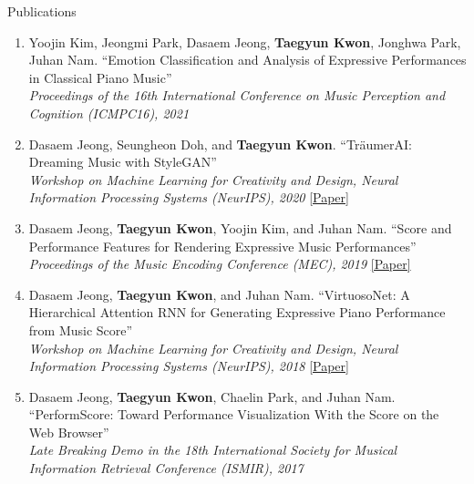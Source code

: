 \begin{rSection}{Publications}
\begin{enumerate}
\begin{minipage}[t]{\linewidth}
\href{https://mac.kaist.ac.kr/pubs/kwon-isbjsb2023.pdf}{[Paper]}
\end{minipage}
\item \begin{minipage}[t]{\linewidth}Yoojin Kim, Jeongmi Park, Dasaem Jeong, \textbf{Taegyun Kwon}, Jonghwa Park, Juhan Nam.
``Emotion Classification and Analysis of Expressive Performances in Classical Piano Music''\\\textit{Proceedings of the 16th International Conference on Music Perception and Cognition (ICMPC16), 2021}
\end{minipage}
\item \begin{minipage}[t]{\linewidth}Dasaem Jeong, Seungheon Doh, and \textbf{Taegyun Kwon}.
``TräumerAI: Dreaming Music with StyleGAN''\\\textit{Workshop on Machine Learning for Creativity and Design, Neural Information Processing Systems (NeurIPS), 2020}
\href{https://arxiv.org/abs/2102.04680}{[Paper]}
\end{minipage}
\item \begin{minipage}[t]{\linewidth}Dasaem Jeong, \textbf{Taegyun Kwon}, Yoojin Kim, and Juhan Nam.
``Score and Performance Features for Rendering Expressive Music Performances''\\\textit{Proceedings of the Music Encoding Conference (MEC), 2019}
\href{https://music-encoding.org/conference/abstracts/abstracts_mec2019/Dasaem%20Jeong%20Music%20Encoding%20Conference%202019.pdf}{[Paper]}
\end{minipage}
\item \begin{minipage}[t]{\linewidth}Dasaem Jeong, \textbf{Taegyun Kwon}, and Juhan Nam.
``VirtuosoNet: A Hierarchical Attention RNN for Generating Expressive Piano Performance from Music Score''\\\textit{Workshop on Machine Learning for Creativity and Design, Neural Information Processing Systems (NeurIPS), 2018}
\href{https://mac.kaist.ac.kr/pubs/JeongKwonNam-neurips2018.pdf}{[Paper]}
\end{minipage}
\item \begin{minipage}[t]{\linewidth}Dasaem Jeong, \textbf{Taegyun Kwon}, Chaelin Park, and Juhan Nam.
``PerformScore: Toward Performance Visualization With the Score on the Web Browser''\\\textit{Late Breaking Demo in the 18th International Society for Musical Information Retrieval Conference (ISMIR), 2017}

\end{minipage}
\end{enumerate}
\end{rSection}
